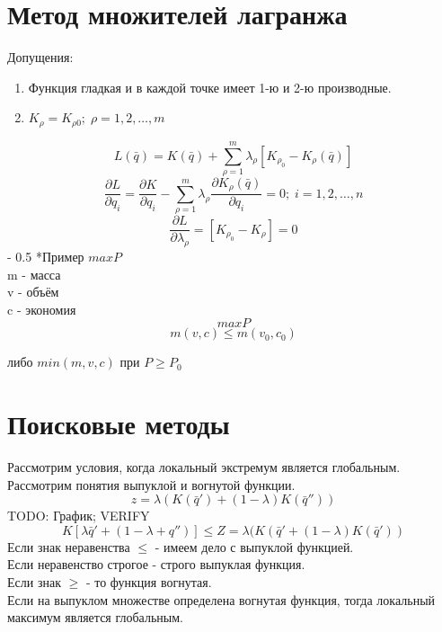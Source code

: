 \documentclass[12pt,a5paper]{scrbook}
\makeatletter
\renewcommand\paragraph{\@startsection{paragraph}{4}{0mm}%
{-\baselineskip} %
{0.5\baselineskip} %
{\normalfont\bfseries}}%
\makeatother
\begin{document}
  \section{Метод множителей лагранжа}
  Допущения:
  \begin{enumerate}
  	\item Функция гладкая и в каждой точке имеет 1-ю и 2-ю производные.
  	\item $K_\rho = K_{\rho0}; \; \rho = 1,2,\ldots,m$  		
  \end{enumerate}
  $$L(\bar{q}) = K(\bar{q}) + \sum_{\rho=1}^{m} \lambda_\rho[K_{\rho_0} - K_\rho(\bar{q})]$$
  $$\frac{\partial L}{\partial q_i} = \frac{\partial K}{\partial q_i} - \sum_{\rho=1}^{m} \lambda_\rho \frac{\partial K_\rho(\bar{q})}{\partial q_i} = 0; \; i=1,2,\ldots,n$$
  $$\frac{\partial L}{\partial \lambda_\rho} = [K_{\rho_0} - K_\rho] = 0$$
  \paragraph*{Пример}
  $max P$ \\
  m - масса \\
  v - объём \\
  c - экономия \\
  $$max P$$
  $$m(v,c) \leq m(v_0,c_0)$$
  \begin{center}
	либо $min(m,v,c)$ при $P \geq P_0$
  \end{center}

  \section{Поисковые методы}
  Рассмотрим условия, когда локальный экстремум является глобальным. Рассмотрим понятия выпуклой и вогнутой функции.\\
  $$z = \lambda (K(\bar{q}') + (1-\lambda)K(\bar{q}''))$$  
  TODO: График;
  VERIFY  
  $$K[\lambda \bar{q}' + (1-\lambda+q'')] \leq Z = \lambda(K(\bar{q}' + (1-\lambda)K(\bar{q}'))$$
  Если знак неравенства $\leq$ - имеем дело с выпуклой функцией.\\
  Если неравенство строгое - строго выпуклая функция.\\
  Если знак $\geq$ - то функция вогнутая.\\
  
  Если на выпуклом множестве определена вогнутая функция, тогда локальный максимум является глобальным.
  
\end{document}
